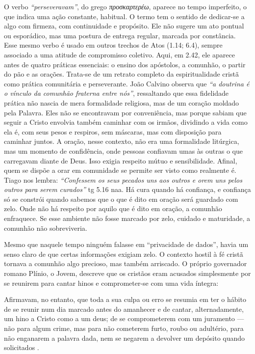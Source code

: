 O verbo \textit{``perseveravam''}, do grego \textit{\foreignlanguage{greek}{προσκαρτερέω}}, aparece no tempo imperfeito, o que indica uma ação constante, habitual. O termo tem o sentido de dedicar-se a algo com firmeza, com continuidade e propósito. Ele não sugere um ato pontual ou esporádico, mas uma postura de entrega regular, marcada por constância. Esse mesmo verbo é usado em outros trechos de Atos (1.14; 6.4), sempre associado a uma atitude de compromisso coletivo. Aqui, em 2.42, ele aparece antes de quatro práticas essenciais: o ensino dos apóstolos, a comunhão, o partir do pão e as orações. Trata-se de um retrato completo da espiritualidade cristã como prática comunitária e perseverante. João Calvino observa que \textit{``a doutrina é o vínculo da comunhão fraterna entre nós''}\cite{calvinoAtos2}, ressaltando que essa fidelidade prática não nascia de mera formalidade religiosa, mas de um coração moldado pela Palavra. Eles não se encontravam por conveniência, mas porque sabiam que seguir a Cristo envolvia também caminhar com os irmãos, dividindo a vida como ela é, com seus pesos e respiros, sem máscaras, mas com disposição para caminhar juntos. A oração, nesse contexto, não era uma formalidade litúrgica, mas um momento de confidência, onde pessoas confiavam umas às outras o que carregavam diante de Deus. Isso exigia respeito mútuo e sensibilidade. Afinal, quem se dispõe a orar em comunidade se permite ser visto como realmente é. Tiago nos lembra: \textit{``Confessem os seus pecados uns aos outros e orem uns pelos outros para serem curados''} \gls{tg} 5.16 \gls{naa}. Há cura quando há confiança, e confiança só se constrói quando sabemos que o que é dito em oração será guardado com zelo. Onde não há respeito por aquilo que é dito em oração, a comunhão enfraquece. Se esse ambiente não fosse marcado por zelo, cuidado e maturidade, a comunhão não sobreviveria.

Mesmo que naquele tempo ninguém falasse em “privacidade de dados”, havia um senso claro de que certas informações exigiam zelo. O contexto hostil à fé cristã tornava a comunhão algo precioso, mas também arriscado. O próprio governador romano Plínio, o Jovem, descreve que os cristãos eram acusados simplesmente por se reunirem para cantar hinos e comprometer-se com uma vida íntegra:

\begin{citacao}
    Afirmavam, no entanto, que toda a sua culpa ou erro se resumia em ter o hábito de se reunir num dia marcado antes do amanhecer e de cantar, alternadamente, um hino a Cristo como a um deus; de se comprometerem com um juramento — não para algum crime, mas para não cometerem furto, roubo ou adultério, para não enganarem a palavra dada, nem se negarem a devolver um depósito quando solicitados \cite[p. 272]{plinioCartasX}.
\end{citacao}

